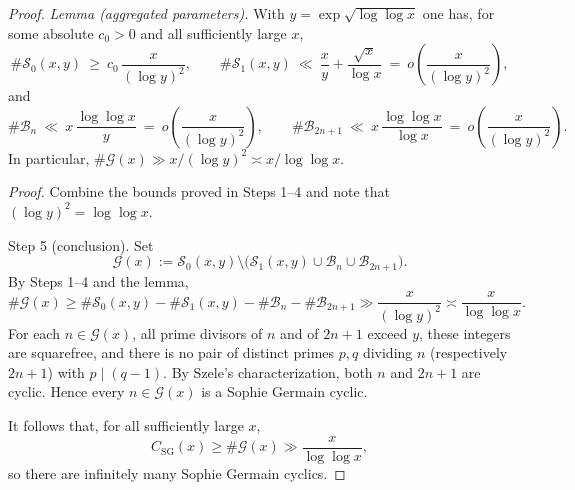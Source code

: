 \begin{proof}
\medskip
\noindent\textit{Lemma (aggregated parameters).} With $y=\exp\sqrt{\log\log x}$ one has, for some absolute $c_0>0$ and all sufficiently large $x$,
\[
 \#\mathcal S_0(x,y)\ \ge\ c_0\,\frac{x}{(\log y)^2},\qquad
 \#\mathcal S_1(x,y)\ \ll\ \frac{x}{y}+\frac{\sqrt{x}}{\log x}\ =\ o\!\left(\frac{x}{(\log y)^2}\right),
\]
and
\[
 \#\mathcal B_n\ \ll\ x\,\frac{\log\log x}{y}\ =\ o\!\left(\frac{x}{(\log y)^2}\right),\qquad
 \#\mathcal B_{2n+1}\ \ll\ x\,\frac{\log\log x}{\log x}\ =\ o\!\left(\frac{x}{(\log y)^2}\right).
\]
In particular, $\#\mathcal G(x)\gg x/(\log y)^2\asymp x/\log\log x$.

\noindent\textit{Proof.} Combine the bounds proved in Steps 1--4 and note that $(\log y)^2=\log\log x$.

Step 5 (conclusion). Set
$$\mathcal G(x):=\mathcal S_0(x,y)\setminus\bigl(\mathcal S_1(x,y)\cup\mathcal B_n\cup\mathcal B_{2n+1}\bigr).$$
By Steps 1--4 and the lemma,
$$\#\mathcal G(x)\ge \#\mathcal S_0(x,y)-\#\mathcal S_1(x,y)-\#\mathcal B_n-\#\mathcal B_{2n+1}\gg \frac{x}{(\log y)^2}\asymp \frac{x}{\log\log x}.$$
For each $n\in\mathcal G(x)$, all prime divisors of $n$ and of $2n+1$ exceed $y$, these integers are squarefree, and there is no pair of distinct primes $p,q$ dividing $n$ (respectively $2n+1$) with $p\mid(q-1)$. By Szele's characterization, both $n$ and $2n+1$ are cyclic. Hence every $n\in\mathcal G(x)$ is a Sophie Germain cyclic.

It follows that, for all sufficiently large $x$,
$$C_{\mathrm{SG}}(x)\ge \#\mathcal G(x)\gg \frac{x}{\log\log x},$$
so there are infinitely many Sophie Germain cyclics. 
\end{proof}
